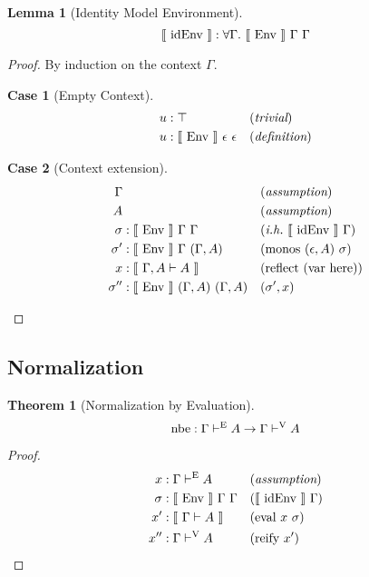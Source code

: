 \documentclass[preprint,nonatbib]{sigplanconf}
\numberwithin{subdefin}{defin}
\theoremstyle{definition}
\newtheorem{theorem}{Theorem}
\numberwithin{subtheorem}{theorem}
\numberwithin{sublemma}{theorem}
\numberwithin{corollary}{theorem}
\numberwithin{case}{theorem}
\numberwithin{slcase}{sublemma}
\numberwithin{scase}{subtheorem}
\newtheorem{lemma}{Lemma}
\newtheorem{lcase}{Case}
\numberwithin{lcase}{lemma}
\def\marr{\rightarrow}
\def\emp{\epsilon}
\def\here{\con{here}}
\def\var{\con{var}}
\def\reify{\fun{reify}}
\def\reflect{\fun{reflect}}
\def\monos{\fun{monos}}
\def\eval{\fun{eval}}
\def\midenv{\el{\fun{idEnv}}}
\def\bydef{(\textit{definition})}
\def\byass{(\textit{assumption})}
\def\bytri{(\textit{trivial})}
\newcommand{\ih}[1]{(\textit{i.h.}~ #1)}
\newcommand{\by}[1]{(#1)}
\newcommand{\turn}[1]{\vdash^\con{#1}}
\newcommand{\all}[1]{\forall#1.~}
\newcommand{\el}[1]{\llbracket ~ #1 ~ \rrbracket}
\newcommand{\con}[1]{\textmd{#1}}
\newcommand{\fun}[1]{\textmd{#1}}
\newcommand{\typm}[1]{\el{\Gamma \vdash #1}}
\newcommand{\gatypm}[1]{\el{\Gamma, A \vdash #1}}
\newcommand{\type}[1]{\Gamma \turn{E} #1}
\newcommand{\typv}[1]{\Gamma \turn{V} #1}
\newcommand{\gmenv}[1]{\el{\fun{Env}}~\Gamma~#1}
\newcommand{\cmenv}[2]{\el{\fun{Env}}~#1~#2}
\begin{document}
\begin{lemma}[Identity Model Environment]
\label{lem:mod:midenv}
$$
\midenv : \all{\Gamma} \gmenv{\Gamma}
$$

\begin{proof}
By induction on the context $\Gamma$.

\begin{lcase}[Empty Context]
\begin{align*}
u &: \top && \bytri\\
u &: \cmenv{\emp}{\emp} && \bydef
\end{align*}
\end{lcase}

\begin{lcase}[Context extension]
\begin{align*}
\Gamma& && \byass\\
A& && \byass\\
\sigma  &: \cmenv{\Gamma}{\Gamma} && \ih{\midenv~\Gamma}\\
\sigma' &: \cmenv{\Gamma}{(\Gamma, A)} && \by{\monos~(\emp, A)~\sigma}\\
x    &: \gatypm{A} && \by{\reflect~(\var~\here)}\\
\sigma'' &: \cmenv{(\Gamma, A)}{(\Gamma, A)} && \by{\sigma', x}
\end{align*}
\end{lcase}

\end{proof}

\end{lemma}


\subsection{Normalization}


\begin{theorem}[Normalization by Evaluation]
\label{thm:mod:nbe}
$$
\fun{nbe} : \type{A} \marr \typv{A}
$$

\begin{proof}
\begin{align*}
x    &: \type{A} && \byass\\
\sigma &: \cmenv{\Gamma}{\Gamma} && \by{\midenv~\Gamma}\\
x'  &: \typm{A} && \by{\eval~x~\sigma}\\
x'' &: \typv{A} && \by{\reify~x'}
\end{align*}
\end{proof}



\end{theorem}
\end{document}
